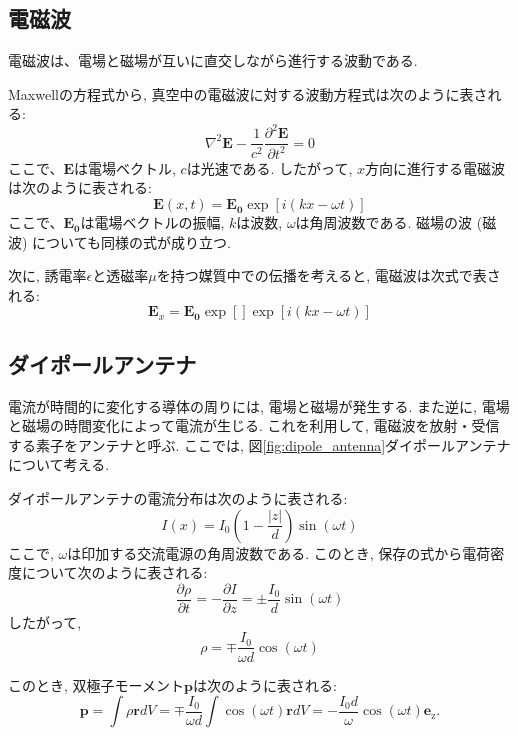 \documentclass[uplatex,dvipdfmx,a4j,12pt]{jsarticle}
\begin{document}
\subsection{電磁波}
電磁波は、電場と磁場が互いに直交しながら進行する波動である.

Maxwellの方程式から, 真空中の電磁波に対する波動方程式は次のように表される:
\begin{equation}
    \nabla^2 \mathbf{E} - \frac{1}{c^2} \frac{\partial^2 \mathbf{E}}{\partial t^2} = 0
\end{equation}
ここで、$\mathbf{E}$は電場ベクトル, $c$は光速である.
したがって, $x$方向に進行する電磁波は次のように表される:
\begin{equation}
    \mathbf{E}(x,t) = \mathbf{E_0} \exp{[i(kx - \omega t)]}
\end{equation}
ここで、$\mathbf{E_0}$は電場ベクトルの振幅, $k$は波数, $\omega$は角周波数である.
磁場の波 (磁波) についても同様の式が成り立つ.

次に, 誘電率$\epsilon$と透磁率$\mu$を持つ媒質中での伝播を考えると, 電磁波は次式で表される:
\begin{equation}
  \mathbf{E}_x = \mathbf{E_0} \exp{[]} \exp{[i(kx - \omega t)]}
\end{equation}

\subsection{ダイポールアンテナ}
電流が時間的に変化する導体の周りには, 電場と磁場が発生する.
また逆に, 電場と磁場の時間変化によって電流が生じる.
これを利用して, 電磁波を放射・受信する素子をアンテナと呼ぶ.
ここでは, 図\ref{fig:dipole_antenna}ダイポールアンテナについて考える.

ダイポールアンテナの電流分布は次のように表される:
\begin{equation}
    I(x) = I_0 \left(1 - \frac{|z|}{d}\right)\sin\left(\omega t\right)
\end{equation}
ここで, $\omega$は印加する交流電源の角周波数である.
このとき, 保存の式から電荷密度について次のように表される:
\begin{equation}
  \frac{\partial \rho}{\partial t}  = - \frac{\partial I}{\partial z} = \pm \frac{I_0}{d}\sin\left(\omega t\right)
\end{equation}
したがって, 
\begin{equation}
  \rho = \mp \frac{I_0}{\omega d}\cos\left(\omega t\right)
\end{equation}

このとき, 双極子モーメント$\mathbf{p}$は次のように表される:
\begin{equation}
  \mathbf{p} = \int \rho \mathbf{r} dV = \mp \frac{I_0}{\omega d}\int \cos\left(\omega t\right) \mathbf{r} dV
  = -\frac{I_0 d}{\omega}\cos\left(\omega t\right) \mathbf{e}_\mathrm{z}.
\end{equation}
\end{document}
